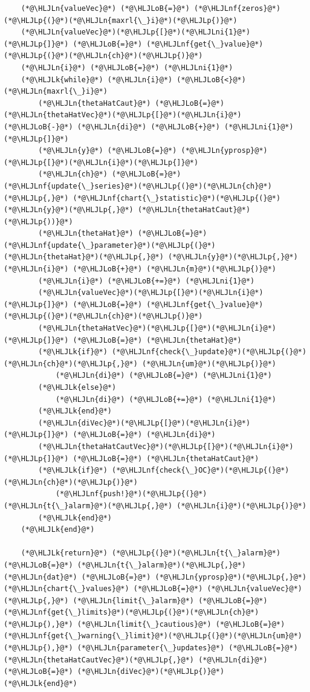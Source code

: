 \documentclass[12pt,a4paper]{article}
\newcommand{\HLJLk}[1]{\textcolor[RGB]{148,91,176}{\textbf{#1}}}
\newcommand{\HLJLn}[1]{#1}
\newcommand{\HLJLnf}[1]{\textcolor[RGB]{66,102,213}{#1}}
\newcommand{\HLJLni}[1]{\textcolor[RGB]{59,151,46}{#1}}
\newcommand{\HLJLoB}[1]{\textcolor[RGB]{102,102,102}{\textbf{#1}}}
\newcommand{\HLJLp}[1]{#1}
\begin{document}
\begin{lstlisting}
    (*@\HLJLn{valueVec}@*) (*@\HLJLoB{=}@*) (*@\HLJLnf{zeros}@*)(*@\HLJLp{(}@*)(*@\HLJLn{maxrl{\_}i}@*)(*@\HLJLp{)}@*)
    (*@\HLJLn{valueVec}@*)(*@\HLJLp{[}@*)(*@\HLJLni{1}@*)(*@\HLJLp{]}@*) (*@\HLJLoB{=}@*) (*@\HLJLnf{get{\_}value}@*)(*@\HLJLp{(}@*)(*@\HLJLn{ch}@*)(*@\HLJLp{)}@*)
    (*@\HLJLn{i}@*) (*@\HLJLoB{=}@*) (*@\HLJLni{1}@*)
    (*@\HLJLk{while}@*) (*@\HLJLn{i}@*) (*@\HLJLoB{<}@*) (*@\HLJLn{maxrl{\_}i}@*)
        (*@\HLJLn{thetaHatCaut}@*) (*@\HLJLoB{=}@*) (*@\HLJLn{thetaHatVec}@*)(*@\HLJLp{[}@*)(*@\HLJLn{i}@*) (*@\HLJLoB{-}@*) (*@\HLJLn{di}@*) (*@\HLJLoB{+}@*) (*@\HLJLni{1}@*)(*@\HLJLp{]}@*)
        (*@\HLJLn{y}@*) (*@\HLJLoB{=}@*) (*@\HLJLn{yprosp}@*)(*@\HLJLp{[}@*)(*@\HLJLn{i}@*)(*@\HLJLp{]}@*)
        (*@\HLJLn{ch}@*) (*@\HLJLoB{=}@*) (*@\HLJLnf{update{\_}series}@*)(*@\HLJLp{(}@*)(*@\HLJLn{ch}@*)(*@\HLJLp{,}@*) (*@\HLJLnf{chart{\_}statistic}@*)(*@\HLJLp{(}@*)(*@\HLJLn{y}@*)(*@\HLJLp{,}@*) (*@\HLJLn{thetaHatCaut}@*)(*@\HLJLp{))}@*)
        (*@\HLJLn{thetaHat}@*) (*@\HLJLoB{=}@*) (*@\HLJLnf{update{\_}parameter}@*)(*@\HLJLp{(}@*)(*@\HLJLn{thetaHat}@*)(*@\HLJLp{,}@*) (*@\HLJLn{y}@*)(*@\HLJLp{,}@*) (*@\HLJLn{i}@*) (*@\HLJLoB{+}@*) (*@\HLJLn{m}@*)(*@\HLJLp{)}@*)
        (*@\HLJLn{i}@*) (*@\HLJLoB{+=}@*) (*@\HLJLni{1}@*)
        (*@\HLJLn{valueVec}@*)(*@\HLJLp{[}@*)(*@\HLJLn{i}@*)(*@\HLJLp{]}@*) (*@\HLJLoB{=}@*) (*@\HLJLnf{get{\_}value}@*)(*@\HLJLp{(}@*)(*@\HLJLn{ch}@*)(*@\HLJLp{)}@*)
        (*@\HLJLn{thetaHatVec}@*)(*@\HLJLp{[}@*)(*@\HLJLn{i}@*)(*@\HLJLp{]}@*) (*@\HLJLoB{=}@*) (*@\HLJLn{thetaHat}@*)
        (*@\HLJLk{if}@*) (*@\HLJLnf{check{\_}update}@*)(*@\HLJLp{(}@*)(*@\HLJLn{ch}@*)(*@\HLJLp{,}@*) (*@\HLJLn{um}@*)(*@\HLJLp{)}@*)
            (*@\HLJLn{di}@*) (*@\HLJLoB{=}@*) (*@\HLJLni{1}@*)
        (*@\HLJLk{else}@*)
            (*@\HLJLn{di}@*) (*@\HLJLoB{+=}@*) (*@\HLJLni{1}@*)
        (*@\HLJLk{end}@*)
        (*@\HLJLn{diVec}@*)(*@\HLJLp{[}@*)(*@\HLJLn{i}@*)(*@\HLJLp{]}@*) (*@\HLJLoB{=}@*) (*@\HLJLn{di}@*)
        (*@\HLJLn{thetaHatCautVec}@*)(*@\HLJLp{[}@*)(*@\HLJLn{i}@*)(*@\HLJLp{]}@*) (*@\HLJLoB{=}@*) (*@\HLJLn{thetaHatCaut}@*)
        (*@\HLJLk{if}@*) (*@\HLJLnf{check{\_}OC}@*)(*@\HLJLp{(}@*)(*@\HLJLn{ch}@*)(*@\HLJLp{)}@*)
            (*@\HLJLnf{push!}@*)(*@\HLJLp{(}@*)(*@\HLJLn{t{\_}alarm}@*)(*@\HLJLp{,}@*) (*@\HLJLn{i}@*)(*@\HLJLp{)}@*)
        (*@\HLJLk{end}@*)
    (*@\HLJLk{end}@*)

    (*@\HLJLk{return}@*) (*@\HLJLp{(}@*)(*@\HLJLn{t{\_}alarm}@*) (*@\HLJLoB{=}@*) (*@\HLJLn{t{\_}alarm}@*)(*@\HLJLp{,}@*) (*@\HLJLn{dat}@*) (*@\HLJLoB{=}@*) (*@\HLJLn{yprosp}@*)(*@\HLJLp{,}@*) (*@\HLJLn{chart{\_}values}@*) (*@\HLJLoB{=}@*) (*@\HLJLn{valueVec}@*)(*@\HLJLp{,}@*) (*@\HLJLn{limit{\_}alarm}@*) (*@\HLJLoB{=}@*) (*@\HLJLnf{get{\_}limits}@*)(*@\HLJLp{(}@*)(*@\HLJLn{ch}@*)(*@\HLJLp{),}@*) (*@\HLJLn{limit{\_}cautious}@*) (*@\HLJLoB{=}@*) (*@\HLJLnf{get{\_}warning{\_}limit}@*)(*@\HLJLp{(}@*)(*@\HLJLn{um}@*)(*@\HLJLp{),}@*) (*@\HLJLn{parameter{\_}updates}@*) (*@\HLJLoB{=}@*) (*@\HLJLn{thetaHatCautVec}@*)(*@\HLJLp{,}@*) (*@\HLJLn{di}@*) (*@\HLJLoB{=}@*) (*@\HLJLn{diVec}@*)(*@\HLJLp{)}@*)
(*@\HLJLk{end}@*)
\end{lstlisting}
\end{document}
